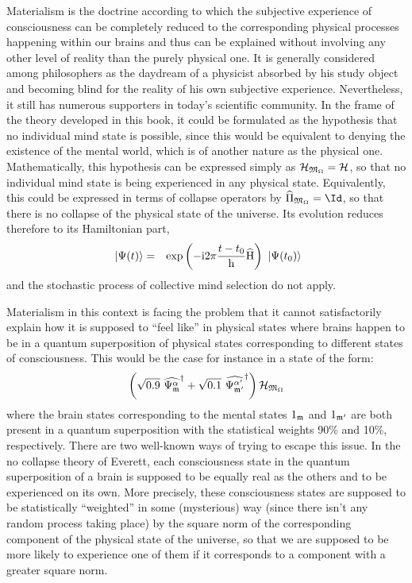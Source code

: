 \documentclass[10pt,a4paper,twoside,openany]{book}
\begin{document}
Materialism is the doctrine according to which the subjective experience of consciousness can be completely reduced to the corresponding physical processes happening within our brains and thus can be explained without involving any other level of reality than the purely physical one. It is generally considered among philosophers as the daydream of a physicist absorbed by his study object and becoming blind for the reality of his own subjective experience. Nevertheless, it still has numerous supporters in today's scientific community. In the frame of the theory developed in this book, it could be formulated as the hypothesis that no individual mind state is possible, since this would be equivalent to denying the existence of the mental world, which is of another nature as the physical one. Mathematically, this hypothesis can be expressed simply as $\mathcal H_{\mathfrak{M}_\Omega} = \mathcal H$, so that no individual mind state is being experienced in any physical state. Equivalently, this could be expressed in terms of collapse operators by $\op{\Pi}_{\cms_\vac} = \Id$, so that there is no collapse of the physical state of the universe. Its evolution reduces therefore to its Hamiltonian part,
\begin{eqnarray*}
\ \left|{\Psi(t)}\right\rangle & = & \mathrm{exp} \left( {- \mathrm{i} 2 \pi \frac{t - t_0} {\mathrm h} \widehat{\mathrm H}} \right) \ \left|{\Psi(t_0)}\right\rangle
\end{eqnarray*}
and the stochastic process of collective mind selection do not apply.

Materialism in this context is facing the problem that it cannot satisfactorily explain how it is supposed to ``feel like'' in physical states where brains happen to be in a quantum superposition of physical states corresponding to different states of consciousness. This would be the case for instance in a state of the form:
\begin{equation*}
\left(\sqrt{0.9}\ \widehat{\Psi_{\mathfrak{m}}^\alpha}^{\dagger} + \sqrt{0.1}\ \widehat{\Psi_{\mathfrak{m}'}^{\alpha'}}^{\dagger}\right) \mathcal H_{\mathfrak{M}_\Omega}
\end{equation*}
where the brain states corresponding to the mental states ${1}_{\mathfrak{m}}$ and ${1}_{\mathfrak{m}'}$ are both present in a quantum superposition with the statistical weights 90\% and 10\%, respectively. There are two well-known ways of trying to escape this issue. In the no collapse theory of Everett, each consciousness state in the quantum superposition of a brain is supposed to be equally real as the others and to be experienced on its own. More precisely, these consciousness states are supposed to be statistically ``weighted'' in some (mysterious) way (since there isn't any random process taking place) by the square norm of the corresponding component of the physical state of the universe, so that we are supposed to be more likely to experience one of them if it corresponds to a component with a greater square norm.
\end{document}
